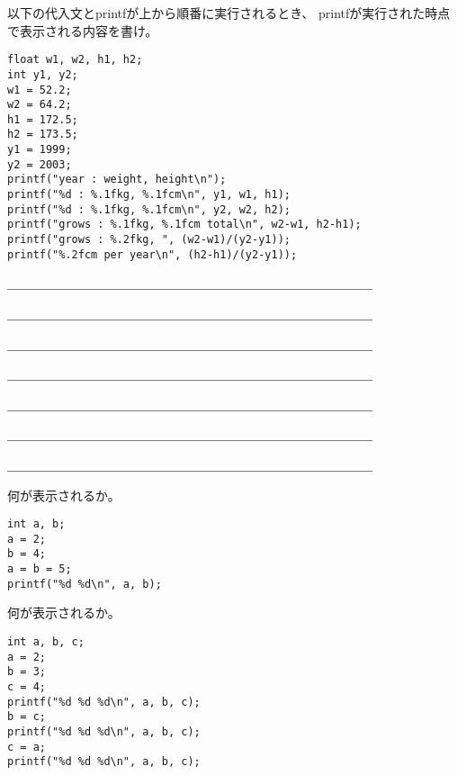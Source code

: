 \documentclass[12pt,a4j]{jarticle}
\newcounter{toi}
\def\toi{%
\bigskip\bigskip\noindent
\addtocounter{toi}{1}
\shadowbox{\bfseries\large 問\thetoi}
\nopagebreak[4]\bigskip\nopagebreak[4]
}
\begin{document}
以下の代入文と{\ttfamily printf}が上から順番に実行されるとき、
{\ttfamily printf}が実行された時点で表示される内容を書け。
\begin{verbatim}
float w1, w2, h1, h2;
int y1, y2;
w1 = 52.2;
w2 = 64.2;
h1 = 172.5;
h2 = 173.5;
y1 = 1999;
y2 = 2003;
printf("year : weight, height\n");
printf("%d : %.1fkg, %.1fcm\n", y1, w1, h1);
printf("%d : %.1fkg, %.1fcm\n", y2, w2, h2);
printf("grows : %.1fkg, %.1fcm total\n", w2-w1, h2-h1);
printf("grows : %.2fkg, ", (w2-w1)/(y2-y1));
printf("%.2fcm per year\n", (h2-h1)/(y2-y1));
\end{verbatim}

＿＿＿＿＿＿＿＿＿＿＿＿＿＿＿＿＿＿＿＿＿＿＿＿＿＿＿＿＿

＿＿＿＿＿＿＿＿＿＿＿＿＿＿＿＿＿＿＿＿＿＿＿＿＿＿＿＿＿

＿＿＿＿＿＿＿＿＿＿＿＿＿＿＿＿＿＿＿＿＿＿＿＿＿＿＿＿＿

＿＿＿＿＿＿＿＿＿＿＿＿＿＿＿＿＿＿＿＿＿＿＿＿＿＿＿＿＿

＿＿＿＿＿＿＿＿＿＿＿＿＿＿＿＿＿＿＿＿＿＿＿＿＿＿＿＿＿

＿＿＿＿＿＿＿＿＿＿＿＿＿＿＿＿＿＿＿＿＿＿＿＿＿＿＿＿＿

＿＿＿＿＿＿＿＿＿＿＿＿＿＿＿＿＿＿＿＿＿＿＿＿＿＿＿＿＿






\toi


何が表示されるか。
\begin{verbatim}
int a, b;
a = 2;
b = 4;
a = b = 5;
printf("%d %d\n", a, b);
\end{verbatim}






\toi


何が表示されるか。
\begin{verbatim}
int a, b, c;
a = 2;
b = 3;
c = 4;
printf("%d %d %d\n", a, b, c);
b = c;
printf("%d %d %d\n", a, b, c);
c = a;
printf("%d %d %d\n", a, b, c);
\end{verbatim}

\end{document}
